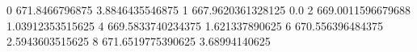 0 671.8466796875 3.8846435546875
1 667.9620361328125 0.0
2 669.0011596679688 1.03912353515625
4 669.5833740234375 1.621337890625
6 670.556396484375 2.5943603515625
8 671.6519775390625 3.68994140625
